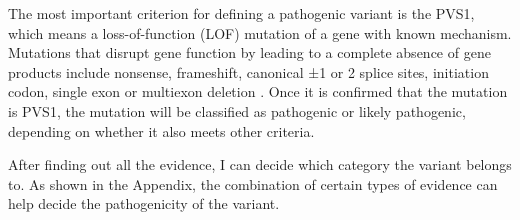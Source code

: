 \documentclass{article}
\begin{document}
\begin{itemize}
    The most important criterion for defining a pathogenic variant is the PVS1, which means a loss-of-function (LOF) mutation of a gene with known mechanism. Mutations that disrupt gene function by leading to a complete absence of gene products include nonsense, frameshift, canonical ±1 or 2 splice sites, initiation codon, single exon or multiexon deletion \cite{ACMG}. Once it is confirmed that the mutation is PVS1, the mutation will be classified as pathogenic or likely pathogenic, depending on whether it also meets other criteria.

    After finding out all the evidence, I can decide which category the variant belongs to. As shown in the Appendix, the combination of certain types of evidence can help decide the pathogenicity of the variant.
\end{itemize}
\end{document}
